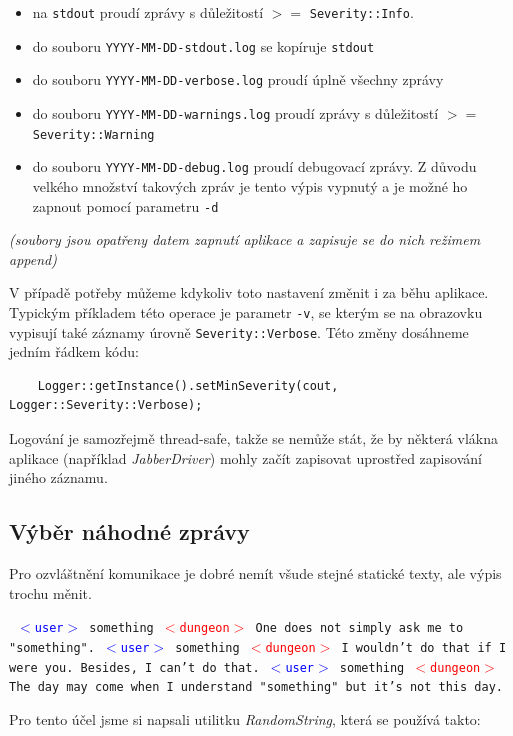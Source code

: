 \documentclass[11pt, a4paper]{article}
\def\class#1{\emph{#1}}
\newenvironment{example}%
{\smallskip\noindent\ignorespaces\obeylines\tt}%
{\smallskip\par\noindent
\ignorespacesafterend}
\def\user{\textcolor{blue}{$<$user$>$ }}
\def\dung{\textcolor{red}{$<$dungeon$>$ }}
\begin{document}
\begin{itemize}
\item na \texttt{stdout} proudí zprávy s důležitostí $>=$ \texttt{Severity::Info}.
\item do souboru \texttt{YYYY-MM-DD-stdout.log} se kopíruje \texttt{stdout}
\item do souboru \texttt{YYYY-MM-DD-verbose.log} proudí úplně všechny zprávy
\item do souboru \texttt{YYYY-MM-DD-warnings.log} proudí zprávy s důležitostí $>=$ \texttt{Severity::Warning}
\item do souboru \texttt{YYYY-MM-DD-debug.log} proudí debugovací zprávy. Z důvodu velkého množství takových zpráv je tento výpis vypnutý a je možné ho zapnout pomocí parametru \texttt{-d}
\end{itemize}

\noindent
\textit{(soubory jsou opatřeny datem zapnutí aplikace a zapisuje se do nich režimem append)}

\noindent
V případě potřeby můžeme kdykoliv toto nastavení změnit i za běhu aplikace. Typickým příkladem této operace je parametr \texttt{-v}, se kterým se na obrazovku vypisují také záznamy úrovně \texttt{Severity::Verbose}. Této změny dosáhneme jedním řádkem kódu:

\begin{lstlisting}
    Logger::getInstance().setMinSeverity(cout, Logger::Severity::Verbose);
\end{lstlisting}

\noindent
Logování je samozřejmě thread-safe, takže se nemůže stát, že by některá vlákna aplikace (například \class{JabberDriver}) mohly začít zapisovat uprostřed zapisování jiného záznamu.

\subsection{Výběr náhodné zprávy}

Pro ozvláštnění komunikace je dobré nemít všude stejné statické texty, ale výpis trochu měnit.

\begin{example}
\user something
\dung One does not simply ask me to "something".
\user something
\dung I wouldn't do that if I were you. Besides, I can't do that.
\user something
\dung The day may come when I understand "something"{} but it's not 
this day.
\end{example}

\noindent Pro tento účel jsme si napsali utilitku \class{RandomString}, která se používá takto:
\end{document}
